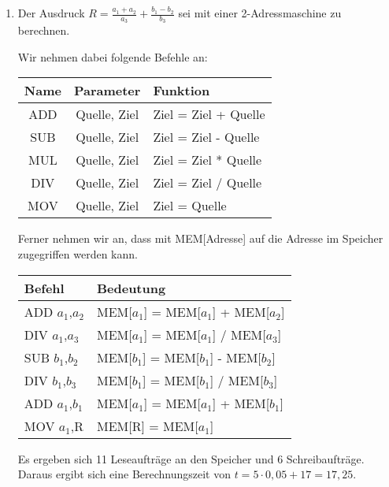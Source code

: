 \documentclass[ngerman]{fbi-aufgabenblatt}
\begin{document}
\begin{enumerate}
	\item Der Ausdruck $R = \frac{a_{1} + a_{2}}{a_{3}} + \frac{b_{1} - b_{2}}{b_{3}}$ sei mit einer 2-Adressmaschine zu berechnen.
	
	Wir nehmen dabei folgende Befehle an:\\
	\begin{tabular}{c|c|l}
	   Name & Parameter 	& Funktion \\\hline
	   ADD	& Quelle, Ziel	& Ziel = Ziel + Quelle \\\hline
	   SUB	& Quelle, Ziel	& Ziel = Ziel - Quelle \\\hline
	   MUL	& Quelle, Ziel	& Ziel = Ziel * Quelle \\\hline
	   DIV	& Quelle, Ziel	& Ziel = Ziel / Quelle \\\hline
	   MOV	& Quelle, Ziel	& Ziel = Quelle
	\end{tabular}
	 
	Ferner nehmen wir an, dass mit MEM[Adresse] auf die Adresse im Speicher zugegriffen werden kann.
	
	\begin{tabular}{l|l}
		Befehl & Bedeutung \\
		\hline
	    ADD $a_{1}$,$a_{2}$ & MEM[$a_{1}$] = MEM[$a_{1}$] + MEM[$a_{2}$] \\
	    DIV $a_{1}$,$a_{3}$ & MEM[$a_{1}$] = MEM[$a_{1}$] / MEM[$a_{3}$] \\
	    SUB $b_{1}$,$b_{2}$ & MEM[$b_{1}$] = MEM[$b_{1}$] - MEM[$b_{2}$] \\
	    DIV $b_{1}$,$b_{3}$ & MEM[$b_{1}$] = MEM[$b_{1}$] / MEM[$b_{3}$] \\
	    ADD $a_{1}$,$b_{1}$ & MEM[$a_{1}$] = MEM[$a_{1}$] + MEM[$b_{1}$] \\
	    MOV $a_{1}$,R & MEM[R] = MEM[$a_{1}$]
	\end{tabular}
	
	Es ergeben sich 11 Leseaufträge an den Speicher und 6 Schreibaufträge. Daraus ergibt sich eine Berechnungszeit von $t = 5\cdot 0,05 + 17 = 17,25$.
\end{enumerate}
\end{document}
